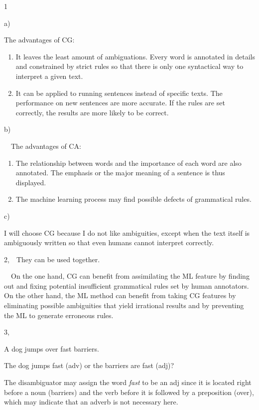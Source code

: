 \documentclass[a4paper]{article}
\title{}
\author{ }
\date{2018-12-11}
\newcommand\liststyleWWNumi{%
\renewcommand\theenumi{\arabic{enumi}}
\renewcommand\theenumii{\alph{enumii}}
\renewcommand\theenumiii{\roman{enumiii}}
\renewcommand\theenumiv{\arabic{enumiv}}
\renewcommand\labelenumi{\theenumi)}
\renewcommand\labelenumii{\theenumii)}
\renewcommand\labelenumiii{\theenumiii.}
\renewcommand\labelenumiv{\theenumiv.}
}
\newcommand\liststyleWWNumii{%
\renewcommand\theenumi{\arabic{enumi}}
\renewcommand\theenumii{\alph{enumii}}
\renewcommand\theenumiii{\roman{enumiii}}
\renewcommand\theenumiv{\arabic{enumiv}}
\renewcommand\labelenumi{\theenumi)}
\renewcommand\labelenumii{\theenumii)}
\renewcommand\labelenumiii{\theenumiii.}
\renewcommand\labelenumiv{\theenumiv.}
}
\begin{document}
\clearpage\setcounter{page}{1}\pagestyle{Standard}

1

a)

The advantages of CG: 

\liststyleWWNumi
\begin{enumerate}
\item It leaves the least amount of ambiguations. Every word is annotated in details and constrained by strict rules so
that there is only one syntactical way to interpret a given text.
\item It can be applied to running sentences instead of specific texts. The performance on new sentences are more
accurate. If the rules are set correctly, the results are more likely to be correct.
\end{enumerate}
b)

\ \ The advantages of CA:

\liststyleWWNumii
\begin{enumerate}
\item The relationship between words and the importance of each word are also annotated. The emphasis or the major
meaning of a sentence is thus displayed.
\item The machine learning process may find possible defects of grammatical rules.
\end{enumerate}
c)

I will choose CG because I do not like ambiguities, except when the text itself is ambiguously written so that even
humans cannot interpret correctly.


\bigskip

2,\ \ They can be used together.

\ \ On the one hand, CG can benefit from assimilating the ML feature by finding out and fixing potential insufficient
grammatical rules set by human annotators. On the other hand, the ML method can benefit from taking CG features by
eliminating possible ambiguities that yield irrational results and by preventing the ML to generate erroneous rules.


\bigskip

3,

A dog jumps over fast barriers.

The dog jumps fast (adv) or the barriers are fast (adj)?

The disambiguator may assign the word \textit{fast} to be an adj since it is located right before a noun (barriers) and
the verb before it is followed by a preposition (over), which may indicate that an adverb is not necessary here.
\end{document}
